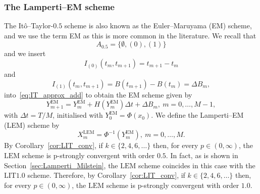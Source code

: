 \documentclass[11pt]{amsart}
\newcommand{\EM}{\textrm{EM}}
\newcommand{\LIT}{\textrm{LIT}}
\newcommand{\LEM}{\textrm{LEM}}
\begin{document}
{\subsubsection{The Lamperti--EM scheme}
The Itô--Taylor-$0.5$ scheme is also known as the Euler--Maruyama (EM) scheme, and we use the term EM as this is more common in the literature. We recall that
\begin{equation*}
A_{0.5} = \{ \emptyset, (0), (1) \}
\end{equation*}
and we insert
\begin{equation*}
I_{(0)}(t_{m},t_{m+1}) = t_{m+1} - t_{m}
\end{equation*}
and
\begin{equation*}
I_{(1)}(t_{m},t_{m+1}) = B(t_{m+1}) - B(t_{m}) = \Delta B_{m},
\end{equation*}
into~\eqref{eq:IT_approx_add} to obtain the EM scheme given by
\begin{equation*}
Y^{\EM}_{m+1} = Y^{\EM}_{m} + H(Y^{\EM}_{m}) \Delta t + \Delta B_{m},\ m=0,\ldots,M-1,
\end{equation*}
with $\Delta t = T/M$, initialised with $Y^{\EM}_{0} = \Phi(x_{0})$. We define the Lamperti--EM (LEM) scheme by
\begin{equation*}
X^{\LEM}_{m} = \Phi^{-1}(Y^{\EM}_{m}),\ m=0,\ldots,M.
\end{equation*}
By Corollary~\ref{cor:LIT_conv}, if $k \in \{2,4,6,\ldots \}$ then, for every $p \in (0,\infty)$, the $\LEM$ scheme is p-strongly convergent with order $0.5$. In fact, as is shown in Section~\ref{sec:Lamperti_Milstein}, the $\LEM$ scheme coincides in this case with the $\LIT 1.0$ scheme. Therefore, by Corollary~\ref{cor:LIT_conv}, if $k \in \{2,4,6,\ldots \}$ then, for every $p \in (0,\infty)$, the $\LEM$ scheme is p-strongly convergent with order $1.0$.

}
\end{document}
